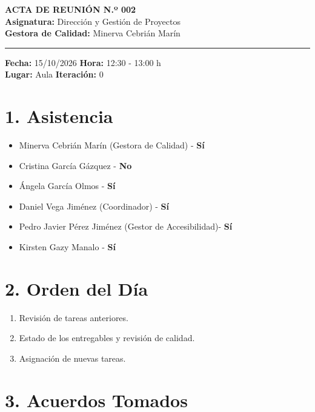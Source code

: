 
\begin{center}
    {\Large \textbf{ACTA DE REUNIÓN N.º 002}}\\[0.2cm]
    \textbf{Asignatura:} Dirección y Gestión de Proyectos\\
    \textbf{Gestora de Calidad:} Minerva Cebrián Marín
\end{center}

\vspace{0.3cm}
\hrule
\vspace{0.4cm}

\noindent \textbf{Fecha:} 15/10/2026 \hfill \textbf{Hora:} 12:30 - 13:00 h\\
\noindent \textbf{Lugar:} Aula  \hfill \textbf{Iteración:} 0

\vspace{0.4cm}

\section*{1. Asistencia}
\begin{itemize}
    \item Minerva Cebrián Marín (Gestora de Calidad) - \textbf{Sí}
    \item Cristina García Gázquez  - \textbf{No}
    \item Ángela García Olmos  - \textbf{Sí}
    \item Daniel Vega Jiménez (Coordinador) - \textbf{Sí}
    \item Pedro Javier Pérez Jiménez (Gestor de Accesibilidad)- \textbf{Sí}
    \item Kirsten Gazy Manalo - \textbf{Sí}

\end{itemize}



\section*{2. Orden del Día}
\begin{enumerate}
    \item Revisión de tareas anteriores.
    \item Estado de los entregables y revisión de calidad.
    \item Asignación de nuevas tareas.
  
\end{enumerate}

\section*{3. Acuerdos Tomados}

